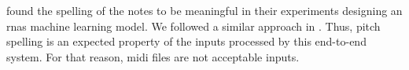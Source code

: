 

\textcite{micchi2020not} found the spelling of the notes to
be meaningful in their experiments designing an \glspl{rna}
machine learning model. We followed a similar approach in
\textcite{napoleslopez2021augmentednet}. Thus, pitch
spelling is an expected property of the inputs processed by
this end-to-end system. For that reason, \gls{midi} files
are not acceptable inputs.